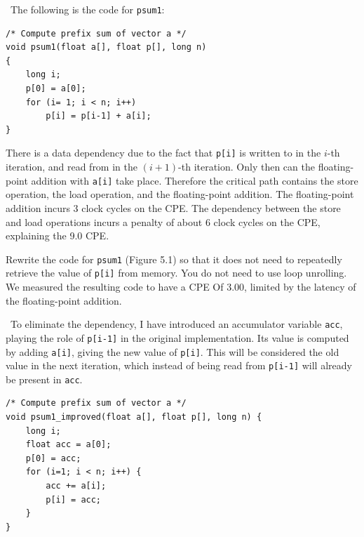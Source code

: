 \documentclass[12pt]{article}
\newenvironment{ex}[2][Exercise]{\begin{trivlist}
		\item[\hskip \labelsep {\bfseries #1}\hskip \labelsep {\bfseries #2.}]}{\end{trivlist}}
\newenvironment{sol}[1][Solution]{\begin{trivlist}
		\item[\hskip \labelsep {\bfseries #1:}]}{\end{trivlist}}
\begin{document}
\begin{sol}
	\
	The following is the code for \texttt{psum1}:
	\begin{lstlisting}
/* Compute prefix sum of vector a */
void psum1(float a[], float p[], long n)
{
	long i;
	p[0] = a[0];
	for (i= 1; i < n; i++)
		p[i] = p[i-1] + a[i];
}
	\end{lstlisting}
	There is a data dependency due to the fact that \texttt{p[i]} is written to in the $i$-th
	iteration, and read from in the $(i+1)$-th iteration. Only then can the floating-point
	addition with \texttt{a[i]} take place. Therefore the critical path contains the
	store operation, the load operation, and the floating-point addition. The floating-point
	addition incurs 3 clock cycles on the CPE. The dependency between the store and load
	operations incurs a penalty of about 6 clock cycles on the CPE, explaining the 9.0
	CPE.
\end{sol}

\begin{ex}{5.12}
	Rewrite the code for \texttt{psum1} (Figure 5.1) so that it does not need to
	repeatedly retrieve the value of \texttt{p[i]} from memory. You do not need to use
	loop unrolling. We measured the resulting code to have a CPE Of 3.00, limited by the
	latency of the floating-point addition.
\end{ex}

\begin{sol}
	\
	To eliminate the dependency, I have introduced an accumulator variable \texttt{acc},
	playing the role of \texttt{p[i-1]} in the original implementation. Its value is computed
	by adding \texttt{a[i]}, giving the new value of \texttt{p[i]}. This will be considered
	the old value in the next iteration, which instead of being read from \texttt{p[i-1]}
	will already be present in \texttt{acc}.
	\begin{lstlisting}
/* Compute prefix sum of vector a */
void psum1_improved(float a[], float p[], long n) {
	long i;
	float acc = a[0];
	p[0] = acc;
	for (i=1; i < n; i++) {
		acc += a[i];
		p[i] = acc;
	}
}
	\end{lstlisting}
\end{sol}
\end{document}
